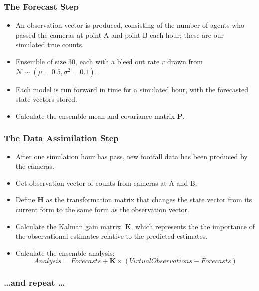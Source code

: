 \subsubsection{The Forecast Step}
\label{methods:application:forecast}

\begin{itemize}
    \item An observation vector is produced, consisting of the number of agents who passed the cameras at point A and point B each hour; these are our simulated true counts.
    \item Ensemble of size 30, each with a bleed out rate $r$ drawn from $\mathcal{N} \sim \left( \mu=0.5, \sigma^2=0.1 \right)$.
    \item Each model is run forward in time for a simulated hour, with the forecasted state vectors stored.
    \item Calculate the ensemble mean and covariance matrix $\mathbf{P}$.
\end{itemize}

\subsubsection{The Data Assimilation Step}
\label{methods:applicaiton:assimilation}

\begin{itemize}
    \item After one simulation hour has pass, new footfall data has been produced by the cameras.
    \item Get observation vector of counts from cameras at A and B.
    \item Define $\mathbf{H}$ as the transformation matrix that changes the state vector from its current form to the same form as the observation vector.
    \item Calculate the Kalman gain matrix, $\mathbf{K}$, which represents the the importance of the observational estimates relative to the predicted estimates.
    \item Calculate the ensemble analysis:
    \begin{equation}
        Analysis = Forecasts + \mathbf{K} \times \left(
            VirtualObservations - Forecasts
        \right)
    \end{equation}
\end{itemize}

\subsubsection{\ldots and repeat \ldots}
\label{methods:application:repeat}

